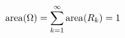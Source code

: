 \documentclass[preview]{standalone}
\begin{document}
\begin{align*}
\special{dvisvgm:raw <g id='unique000'>}\operatorname{area}(\Omega)=\sum_{k=1}^{\infty}\operatorname{area}(R_k)=1\special{dvisvgm:raw </g>}
\end{align*}
\end{document}

